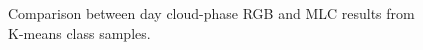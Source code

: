 \documentclass[12pt]{article}
\begin{document}
\begin{figure}[h!]
    \centering

    \begin{center}
    \end{center}

    \caption{Comparison between day cloud-phase RGB and MLC results from K-means class samples.}
    \label{mlc_km_dcp_compare}
\end{figure}
\end{document}
